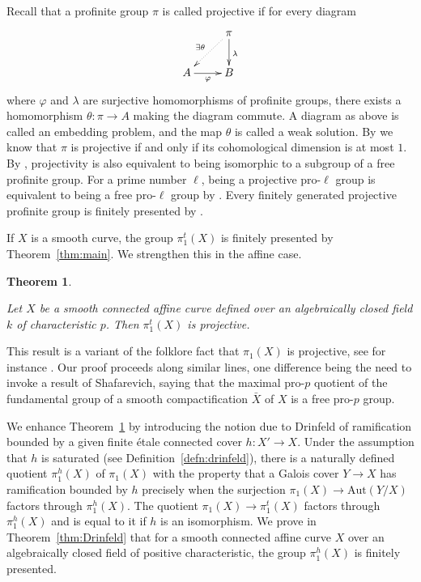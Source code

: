 \documentclass[12pt]{amsart}
\theoremstyle{plain}
\newtheorem{thm}{Theorem}
\theoremstyle{definition}
\numberwithin{thm}{section}
\newcommand{\ga}[2]{\begin{gather}\label{#1}#2 \end{gather}}
\numberwithin{equation}{section}
\begin{document}
Recall that a profinite group $\pi$ is called projective if for every diagram
\ga{}{\xymatrix{ &\ar@{.>}[dl]_{\exists \theta} \pi \ar[d]^{\lambda} \\
A \ar[r]_{\varphi} & B
} \notag
}
 where $\varphi$ and $\lambda$ are surjective homomorphisms of profinite groups, there exists a homomorphism $\theta \colon \pi \to A$
 making the diagram commute. A diagram as above is called an embedding problem, and the map $\theta$ is called a weak solution.
By  \cite[Proposition 7.6.7]{RZ10} we know  that $\pi$ is projective if and only if its cohomological dimension is at most $1$.
By \cite[Lemma 7.6.3]{RZ10}, projectivity is also equivalent to being isomorphic to a subgroup of a free profinite group.
For a prime number $\ell$, being a projective pro-$\ell$ group is equivalent to being a free pro-$\ell$ group by \cite[Theorem 7.7.4]{RZ10}. 
Every finitely generated projective profinite group is finitely presented by \cite[Proposition 1.1]{Lub01}.


If $X$ is a smooth curve,  the group $\pi_1^t(X)$ is finitely presented by Theorem~\ref{thm:main}.  
We strengthen this in the affine case.

\begin{thm} \label{thm:proj}

Let $X$ be a smooth connected affine curve defined over an algebraically closed field $k$ of characteristic $p$.
Then $\pi^t_1(X)$ is projective.

\end{thm}

This result is a variant of the folklore fact that $\pi_1(X)$ is projective, see for instance \cite[Theorems 10.1.2, 10.1.12]{NSW13}. 
Our proof proceeds along similar lines, one difference being the need to invoke a result of Shafarevich, saying that the maximal pro-$p$ quotient of the fundamental group of a smooth compactification $\bar X$ of $X$ is a free pro-$p$ group. 

We  enhance Theorem~\ref{thm:proj} by introducing the notion due to Drinfeld of ramification bounded by a given finite \'etale connected cover 
$h: X'\to X$. Under the assumption that $h$ is saturated (see Definition~\ref{defn:drinfeld}), there is  a naturally defined  quotient $\pi_1^h(X)$ of $\pi_1(X)$ with the property that a Galois cover $Y \to X$ has ramification bounded by $h$ precisely when the surjection $\pi_1(X) \to \mathrm{Aut}(Y/X)$ factors through $\pi_1^h(X)$.  
The quotient $\pi_1(X)\to \pi_1^t(X)$ factors through $\pi_1^h(X)$ and is equal to it if $h$ is an isomorphism. 
We prove in Theorem~\ref{thm:Drinfeld} that for a smooth connected affine curve $X$ over an algebraically closed field of positive characteristic, the group $\pi_1^h(X)$  is finitely presented.
\end{document}
